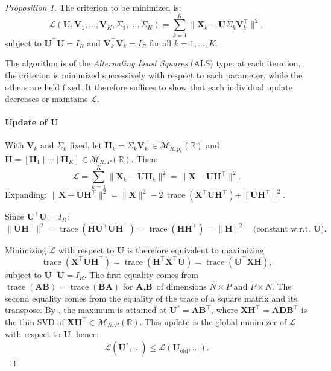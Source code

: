 \documentclass[11pt]{article}
\DeclareMathOperator{\trace}{\mathrm{trace}}
\newcommand{\X}{\mathbf{X}}
\newcommand{\U}{\mathbf{U}}
\newcommand{\V}{\mathbf{V}}
\newcommand{\HH}{\mathbf{H}}
\begin{document}
\begin{proof}[Proposition 1]
	The criterion to be minimized is:
\[
  \mathcal{L}(\U, \V_1, \ldots, \V_K, \Sigma_1, \ldots, \Sigma_K)
  = \sum_{k=1}^{K} \bigl\| \X_k - \U \Sigma_k \V_k^\top \bigr\|^2,
\]
subject to $\U^\intercal \U = I_R$ and $\V_k^\intercal \V_k = I_R$ for all $k = 1, \ldots, K$.

The algorithm is of the \emph{Alternating Least Squares} (ALS) type: at each iteration, the criterion is minimized successively with respect to each parameter, while the others are held fixed. It therefore suffices to show that each individual update decreases or maintains $\mathcal{L}$.

\paragraph{Update of $\U$} With $\V_k$ and $\Sigma_k$ fixed, let $\HH_k = \Sigma_k \V_k^\intercal \in \mathcal{M}_{R,p_k}(\mathbb{R})$ and
$\HH = [\HH_1 \mid \cdots \mid \HH_K] \in \mathcal{M}_{R,P}(\mathbb{R})$. Then:
\[
  \mathcal{L} = \sum_{k=1}^{K} \|\X_k - \U \HH_k\|^2 = \|\X - \U \HH^\intercal\|^2.
\]
Expanding:
$\|\X - \U \HH^\intercal\|^2
  = \|\X\|^2 - 2\,\operatorname{trace}(\X^\intercal \U \HH^\intercal) + \|\U \HH^\intercal\|^2.$

\noindent Since $\U^\intercal \U = I_R$: $\|\U \HH^\intercal\|^2
  = \operatorname{trace}(\HH \U^\intercal \U \HH^\intercal)
  = \operatorname{trace}(\HH \HH^\intercal)
  = \|\HH\|^2 \quad \text{(constant w.r.t.\ } \U\text{)}.$

\noindent Minimizing $\mathcal{L}$ with respect to $\U$ is therefore equivalent to
maximizing $$\trace(\X^\intercal\U\HH^\intercal)=\trace(\HH^\intercal\X^\intercal\U)=\trace(\U^\intercal\X\HH),$$
subject to $\U^\intercal \U = I_R$. The first equality comes from $\trace(\textbf{A}\textbf{B})=\trace(\textbf{B}\textbf{A})$ for $\textbf{A},\textbf{B}$ of dimensions $N\times P$ and $P\times N$. The second equality comes from the equality of the trace of a square matrix and its transpose. By \cite{cliff1966}, the maximum is attained at $\U^* = \mathbf A\mathbf B^\intercal$, where $\X\HH^\intercal=\mathbf A\mathbf D\mathbf B^\intercal$ is the thin SVD of $\X\HH^\intercal\in\mathcal M_{N,R}(\mathbb R)$.
This update is the global minimizer of $\mathcal{L}$ with respect to $\U$, hence:
\[
  \mathcal{L}(\U^*, \ldots) \leq \mathcal{L}(\U_{\mathrm{old}}, \ldots).
\]

\end{proof}
\end{document}
